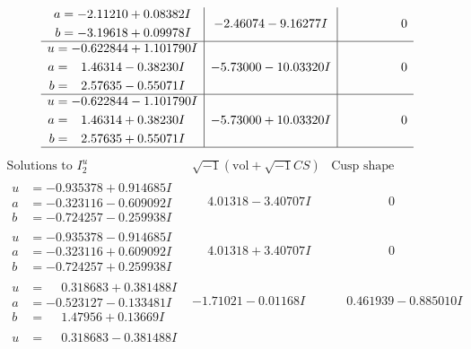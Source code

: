 \documentclass[1p]{elsarticle_modified}
\theoremstyle{definition}
\newcommand{\I}{\sqrt{-1}}
\begin{document}
$$\begin{array}{c|c|c}
\begin{aligned}
a &= -2.11210 + 0.08382 I \\
b &= -3.19618 + 0.09978 I\end{aligned}
 & -2.46074 - 9.16277 I & \phantom{-0.000000 } 0 \\ \hline\begin{aligned}
u &= -0.622844 + 1.101790 I \\
a &= \phantom{-}1.46314 - 0.38230 I \\
b &= \phantom{-}2.57635 - 0.55071 I\end{aligned}
 & -5.73000 - 10.03320 I & \phantom{-0.000000 } 0 \\ \hline\begin{aligned}
u &= -0.622844 - 1.101790 I \\
a &= \phantom{-}1.46314 + 0.38230 I \\
b &= \phantom{-}2.57635 + 0.55071 I\end{aligned}
 & -5.73000 + 10.03320 I & \phantom{-0.000000 } 0\\
 \hline 
 \end{array}$$\newpage$$\begin{array}{c|c|c}  
\text{Solutions to }I^u_{2}& \I (\text{vol} + \sqrt{-1}CS) & \text{Cusp shape}\\
 \hline 
\begin{aligned}
u &= -0.935378 + 0.914685 I \\
a &= -0.323116 - 0.609092 I \\
b &= -0.724257 - 0.259938 I\end{aligned}
 & \phantom{-}4.01318 - 3.40707 I & \phantom{-0.000000 } 0 \\ \hline\begin{aligned}
u &= -0.935378 - 0.914685 I \\
a &= -0.323116 + 0.609092 I \\
b &= -0.724257 + 0.259938 I\end{aligned}
 & \phantom{-}4.01318 + 3.40707 I & \phantom{-0.000000 } 0 \\ \hline\begin{aligned}
u &= \phantom{-}0.318683 + 0.381488 I \\
a &= -0.523127 - 0.133481 I \\
b &= \phantom{-}1.47956 + 0.13669 I\end{aligned}
 & -1.71021 - 0.01168 I & \phantom{-}0.461939 - 0.885010 I \\ \hline\begin{aligned}
u &= \phantom{-}0.318683 - 0.381488 I \\

\end{aligned}
\end{array}$$
\end{document}
